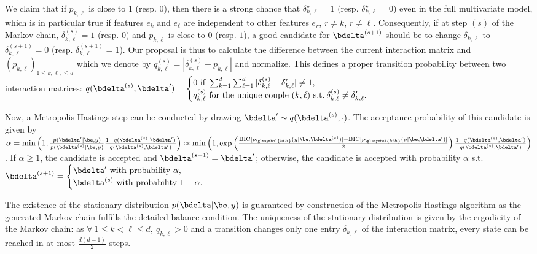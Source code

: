 We claim that if $p_{k,\ell}$ is close to $1$ (resp. $0$), then there is a strong chance that $\delta_{k,\ell}^\star = 1$ (resp. $\delta_{k,\ell}^\star = 0$) even in the full multivariate model, which is in particular true if features $e_k$ and $e_{\ell}$ are independent to other features $e_r$, $r \neq k$, $r \neq \ell$. Consequently, if at step $(s)$ of the Markov chain, $\delta_{k,\ell}^{(s)} = 1$ (resp. $0$) and $p_{k,\ell}$ is close to $0$ (resp. $1$), a good candidate for $\bdelta^{(s+1)}$ should be to change $\delta_{k,\ell}$ to $\delta_{k,\ell}^{(s+1)} = 0$ (resp. $\delta_{k,\ell}^{(s+1)} = 1$). Our proposal is thus to calculate the difference between the current interaction matrix and $(p_{k,\ell})_{1 \leq k,\ell, \leq d}$ which we denote by $q_{k,\ell}^{(s)} = |\delta_{k,\ell}^{(s)} - p_{k,\ell}|$ and normalize. This defines a proper transition probability between two interaction matrices: $q(\bdelta^{(s)},\bdelta') = \begin{cases} 0 \text{ if } \sum_{k=1}^d \sum_{\ell=1}^d |\delta^{(s)}_{k,\ell} - \delta_{k,\ell}'| \neq 1, \\ q_{k,\ell}^{(s)} \text{ for the unique couple } (k,\ell) \text{ s.t.} \: \delta^{(s)}_{k,\ell} \neq \delta_{k,\ell}'. \end{cases}$

Now, a Metropolis-Hastings step can be conducted by drawing $\bdelta' \sim q(\bdelta^{(s)},\cdot)$. The acceptance probability of this candidate is given by $\alpha = \min \left( 1, \frac{p(\bdelta' | \be,y)}{p(\bdelta^{(s)} | \be, y)} \frac{1-q(\bdelta^{(s)},\bdelta')}{q(\bdelta^{(s)},\bdelta')} \right) \approx \min \left( 1, \exp \left( \frac{\text{BIC}[p_{\glssymbol{bth}}(y | \be, \bdelta^{(s)})] - \text{BIC}[p_{\glssymbol{bth}}(y | \be, \bdelta')]}{2} \right) \frac{1-q(\bdelta^{(s)},\bdelta')}{q(\bdelta^{(s)},\bdelta')} \right)$. If $\alpha \geq 1$, the candidate is accepted and $\bdelta^{(s+1)} = \bdelta'$; otherwise, the candidate is accepted with probability $\alpha$ s.t.\ $\bdelta^{(s+1)} = \begin{cases} \bdelta' \text{ with probability } \alpha, \\ \bdelta^{(s)} \text{ with probability } 1-\alpha. \end{cases}$

The existence of the stationary distribution $p(\bdelta | \be,y)$ is guaranteed by construction of the Metropolis-Hastings algorithm as the generated Markov chain fulfills the detailed balance condition. The uniqueness of the stationary distribution is given by the ergodicity of the Markov chain: as $\forall \: 1 \leq  k < \ell \leq d, \: q_{k,\ell} > 0$ and a transition changes only one entry $\delta_{k,\ell}$ of the interaction matrix, every state can be reached in at most $\frac{d(d-1)}{2}$ steps.

